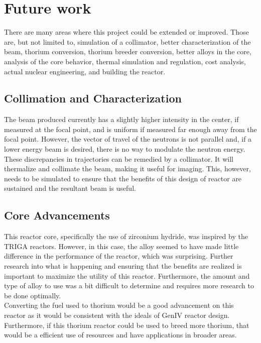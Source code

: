 \section{Future work}
\label{sec:future}

There are many areas where this project could be extended or improved. Those are, but not limited to, simulation of a collimator, better characterization of the beam, thorium conversion, thorium breeder conversion, better alloys in the core, analysis of the core behavior, thermal simulation and regulation, cost analysis, actual nuclear engineering, and building the reactor.

\subsection{Collimation and Characterization}

The beam produced currently has a slightly higher intensity in the center, if measured at the focal point, and is uniform if measured far enough away from the focal point. However, the vector of travel of the neutrons is not parallel and, if a lower energy beam is desired, there is no way to modulate the neutron energy. These discrepancies in trajectories can be remedied by a collimator. It will thermalize and collimate the beam, making it useful for imaging. This, however, needs to be simulated to ensure that the benefits of this design of reactor are sustained and the resultant beam is useful.

\subsection{Core Advancements}

This reactor core, specifically the use of zirconium hydride, was inspired by the TRIGA reactors. However, in this case, the alloy seemed to have made little difference in the performance of the reactor, which was surprising. Further research into what is happening and ensuring that the benefits are realized is important to maximize the utility of this reactor. Furthermore, the amount and type of alloy to use was a bit difficult to determine and requires more research to be done optimally.\\

Converting the fuel used to thorium would be a good advancement on this reactor as it would be consistent with the ideals of GenIV reactor design. Furthermore, if this thorium reactor could be used to breed more thorium, that would be a efficient use of resources and have applications in broader areas.

